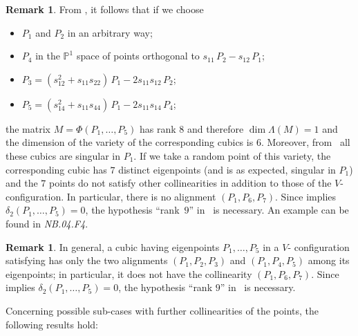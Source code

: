 \documentclass[a4paper, 11pt, reqno]{amsart}
\theoremstyle{plain}
\theoremstyle{definition}
\newtheorem{rmk}[lemma]{Remark}
\newcommand{\p}{\mathbb{P}}
\newcommand{\nb}[2]{\textsl{{NB}.{#1}.{#2}}}
\begin{document}
\begin{rmk}
From , it follows that if we choose
%
\begin{itemize}
  \item $P_1$ and $P_2$ in an arbitrary way;
  \item $P_4$ in the $\p^1$
  space of points orthogonal to $s_{11} \, P_2 - s_{12} \, P_1$;
  \item $P_3 = (s_{12}^2+s_{11}s_{22}) \, P_1 - 2s_{11}s_{12} \, P_2$;
  \item $P_5 = (s_{14}^2+s_{11}s_{44}) \, P_1 - 2s_{11}s_{14} \, P_4$;
\end{itemize}
%
the matrix $M = \Phi(P_1, \dots, P_5)$ has rank $8$
and therefore $\dim \Lambda(M) = 1$ and the dimension of the variety
of the corresponding cubics is $6$.
Moreover, from~ all these cubics
are singular in $P_1$.
If we take a random point of this variety, the corresponding
cubic has $7$ distinct eigenpoints (and is as expected, singular in $P_1$) and the
$7$ points do not satisfy other collinearities in addition to those of the
$V$- configuration.
In particular, there is no alignment $(P_1, P_6, P_7)$.
Since  implies $\delta_2(P_1, \dots, P_5) = 0$, the hypothesis ``rank~$9$'' in~ is necessary.
An example can be found in \nb{04}{F4}.
\end{rmk}

\begin{rmk}
\label{remark:particular_cases}
In general, a cubic having eigenpoints $P_1, \dots, P_5$ in a $V$- configuration satisfying  has only the two alignments $(P_1, P_2, P_3)$ and $(P_1, P_4, P_5)$ among its eigenpoints;
in particular, it does not have the collinearity $(P_1, P_6, P_7)$.
Since  implies $\delta_2(P_1, \dots, P_5) = 0$, the hypothesis ``rank $9$'' in~ is necessary.
\end{rmk}

Concerning possible sub-cases with further collinearities of the points,
the following results hold:
\end{document}
